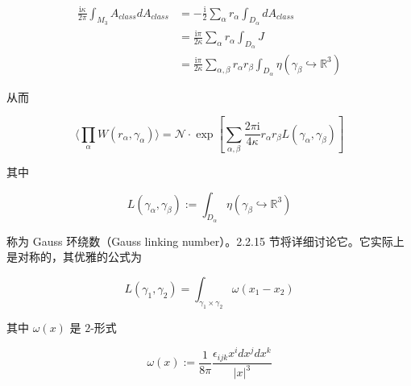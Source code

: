 \begin{equation}
  \begin{aligned}
    \frac{\mathrm{i}\kappa}{2\pi}\int_{M_3}A_{class}dA_{class}
    &=-\frac{\mathrm{i}}{2}\sum_\alpha r_\alpha\int_{D_\alpha}dA_{class}\\
    &=\frac{\mathrm{i}\pi}{2\kappa}\sum_\alpha r_\alpha\int_{D_\alpha}J\\
    &=\frac{\mathrm{i}\pi}{2\kappa}\sum_{\alpha,\beta}r_\alpha r_\beta\int_{D_\alpha}\eta(\gamma_\beta\hookrightarrow\mathbb{R}^3)
  \end{aligned}
  \tag{2.254}
  \label{eq:2.254}
\end{equation}

从而

\begin{equation}
  \Big\langle\prod_\alpha W(r_\alpha,\gamma_\alpha)\Big\rangle
  =\mathcal{N}\cdot\exp\left[\sum_{\alpha,\beta}\frac{2\pi\mathrm{i}}{4\kappa}r_\alpha r_\beta L(\gamma_\alpha,\gamma_\beta)\right]
  \tag{2.255}
  \label{eq:2.255}
\end{equation}

其中

\begin{equation}
  L(\gamma_\alpha,\gamma_\beta):=\int_{D_\alpha}\eta(\gamma_\beta\hookrightarrow\mathbb{R}^3)
  \tag{2.256}
  \label{eq:2.256}
\end{equation}

称为 Gauss 环绕数（Gauss linking number）。2.2.15 节将详细讨论它。它实际上是对称的，其优雅的公式为

\begin{equation}
  L(\gamma_1,\gamma_2)=\int_{\gamma_1\times\gamma_2}\omega(x_1-x_2)
  \tag{2.257}
  \label{eq:2.257}
\end{equation}

其中 $\omega(x)$ 是 $2$-形式

\begin{equation}
  \omega(x):=\frac{1}{8\pi}\frac{\epsilon_{ijk}x^idx^jdx^k}{|x|^3}
  \tag{2.258}
  \label{eq:2.258}
\end{equation}

